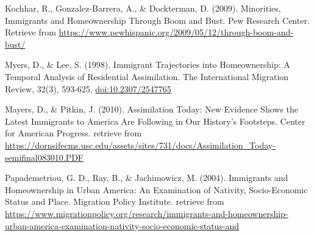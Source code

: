\documentclass[11pt,]{article}
\begin{document}
Kochhar, R., Gonzalez-Barrera, A., \& Dockterman, D. (2009). Minorities,
Immigrants and Homeownership Through Boom and Bust. Pew Research Center.
Retrieve from
\url{https://www.pewhispanic.org/2009/05/12/through-boom-and-bust/}

Myers, D., \& Lee, S. (1998). Immigrant Trajectories into Homeownership:
A Temporal Analysis of Residential Assimilation. The International
Migration Review, 32(3), 593-625. \url{doi:10.2307/2547765}

Mayers, D., \& Pitkin, J. (2010). Assimilation Today: New Evidence Shows
the Latest Immigrants to America Are Following in Our History's
Footsteps. Center for American Progress. retrieve from
\url{https://dornsifecms.usc.edu/assets/sites/731/docs/Assimilation_Today-semifinal083010.PDF}

Papademetriou, G. D., Ray, B., \& Jachimowicz, M. (2004). Immigrants and
Homeownership in Urban America: An Examination of Nativity,
Socio-Economic Status and Place. Migration Policy Institute. retrieve
from
\url{https://www.migrationpolicy.org/research/immigrants-and-homeownership-urban-america-examination-nativity-socio-economic-status-and}




\end{document}
